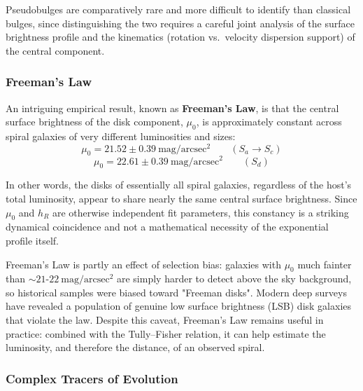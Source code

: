 \medskip

Pseudobulges are comparatively rare and more difficult to identify than classical bulges, since distinguishing the two requires a careful joint analysis of the surface brightness profile and the kinematics (rotation vs.\ velocity dispersion support) of the central component.

\subsubsection{Freeman's Law}

An intriguing empirical result, known as \textbf{Freeman's Law}, is that the central surface brightness of the disk component, $\mu_0$, is approximately constant across spiral galaxies of very different luminosities and sizes:
$$
\mu_0 = 21.52 \pm 0.39 \ \mathrm{mag/arcsec^2} \qquad (S_a \rightarrow S_c)
$$
$$
\mu_0 = 22.61 \pm 0.39 \ \mathrm{mag/arcsec^2} \qquad (S_d)
$$

In other words, the disks of essentially all spiral galaxies, regardless of the host's total luminosity, appear to share nearly the same central surface brightness. Since $\mu_0$ and $h_R$ are otherwise independent fit parameters, this constancy is a striking dynamical coincidence and not a mathematical necessity of the exponential profile itself.

\begin{tipsblock}
Freeman's Law is partly an effect of selection bias: galaxies with $\mu_0$ much fainter than $\sim 21$-$22\ \mathrm{mag/arcsec^2}$ are simply harder to detect above the sky background, so historical samples were biased toward "Freeman disks". Modern deep surveys have revealed a population of genuine low surface brightness (LSB) disk galaxies that violate the law. Despite this caveat, Freeman's Law remains useful in practice: combined with the Tully--Fisher relation, it can help estimate the luminosity, and therefore the distance, of an observed spiral.
\end{tipsblock}

\subsubsection{Complex Tracers of Evolution}

